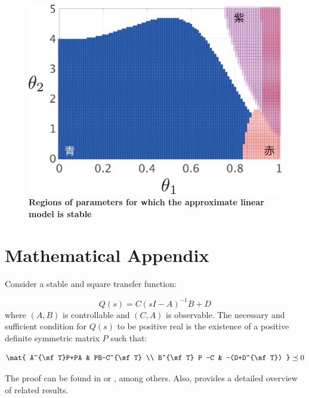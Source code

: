 \documentclass[graybox, envcountchap]{svmult}
\begin{document}
\begin{figure}[t!]
{\begin{minipage}{0.49\linewidth}
    \medskip
  \end{minipage}
  \begin{minipage}{0.49\linewidth}
    \centering
    \includegraphics[width = 0.90\linewidth]{figs/Y0.01D0.01X}
    \medskip
  \end{minipage}
}
 \caption{\textbf{Regions of parameters for which the approximate linear model is stable}}
 \label{fig:stacheckX}
\medskip
\end{figure}



\section*{Mathematical Appendix}
\begin{lemma}\label{lem:prlem}
Consider a stable and square transfer function:

\[
  Q(s)=C(sI-A)^{-1}B + D
\]
where $(A,B)$ is controllable and $(C,A)$ is observable.
The necessary and sufficient condition for $Q(s)$ to be positive real is the
existence of a positive definite symmetric matrix $P$ such that:

\begin{equation*}%
\mat{
A^{\sf T}P+PA & PB-C^{\sf T} \\
B^{\sf T} P -C & -(D+D^{\sf T})
}\preceq 0
\end{equation*}
\end{lemma}

The proof can be found in \cite[Theorem 5.31]{antoulas2005approximation} or
\cite[Theorem 3]{anderson1967system}, among others. Also,
\cite{kottenstette2010relationships} provides a detailed overview of related
results.
\end{document}
